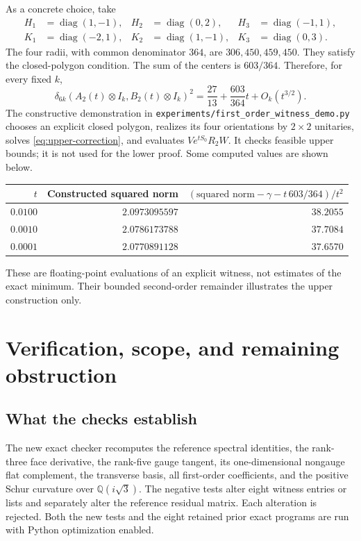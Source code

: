 \documentclass[11pt]{article}
\theoremstyle{remark}\newtheorem{remark}[theorem]{Remark}
\newcommand{\Q}{\mathbb Q}
\newcommand{\diag}{\operatorname{diag}}
\newcommand{\dd}{\delta}
\begin{document}
As a concrete choice, take
\begin{align*}
 H_1&=\diag(1,-1),& H_2&=\diag(0,2),&H_3&=\diag(-1,1),\\
 K_1&=\diag(-2,1),& K_2&=\diag(1,-1),&K_3&=\diag(0,3).
\end{align*}
The four radii, with common denominator $364$, are $306,450,459,450$. They satisfy the closed-polygon condition. The sum of the centers is $603/364$. Therefore, for every fixed $k$,
\begin{equation}\label{eq:example}
 \dd_{6k}(A_2(t)\otimes I_k,B_2(t)\otimes I_k)^2
 =\frac{27}{13}+\frac{603}{364}t+O_k(t^{3/2}).
\end{equation}
The constructive demonstration in \texttt{experiments/first\_order\_witness\_demo.py} chooses an explicit closed polygon, realizes its four orientations by $2\times2$ unitaries, solves \eqref{eq:upper-correction}, and evaluates $Ve^{tS_0}R_2W$. It checks feasible upper bounds; it is not used for the lower proof. Some computed values are shown below.
\begin{center}
\begin{tabular}{@{}rrr@{}}
\toprule
$t$ & Constructed squared norm & $(\text{squared norm}-\gamma-t\,603/364)/t^2$\\
\midrule
$0.0100$ & $2.0973095597$ & $38.2055$\\
$0.0010$ & $2.0786173788$ & $37.7084$\\
$0.0001$ & $2.0770891128$ & $37.6570$\\
\bottomrule
\end{tabular}
\end{center}
These are floating-point evaluations of an explicit witness, not estimates of the exact minimum. Their bounded second-order remainder illustrates the upper construction only.

\section{Verification, scope, and remaining obstruction}
\subsection{What the checks establish}
The new exact checker recomputes the reference spectral identities, the rank-three face derivative, the rank-five gauge tangent, its one-dimensional nongauge flat complement, the transverse basis, all first-order coefficients, and the positive Schur curvature over $\Q(i\sqrt3)$. The negative tests alter eight witness entries or lists and separately alter the reference residual matrix. Each alteration is rejected. Both the new tests and the eight retained prior exact programs are run with Python optimization enabled.
\end{document}
